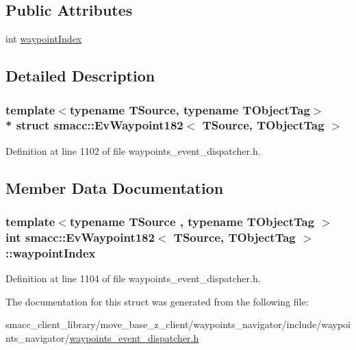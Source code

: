 \subsection*{Public Attributes}
\begin{DoxyCompactItemize}
\item 
int \hyperlink{structsmacc_1_1EvWaypoint182_aa585b165a09108cb04d02b1f05009b06}{waypoint\+Index}
\end{DoxyCompactItemize}


\subsection{Detailed Description}
\subsubsection*{template$<$typename T\+Source, typename T\+Object\+Tag$>$\\*
struct smacc\+::\+Ev\+Waypoint182$<$ T\+Source, T\+Object\+Tag $>$}



Definition at line 1102 of file waypoints\+\_\+event\+\_\+dispatcher.\+h.



\subsection{Member Data Documentation}
\subsubsection[{\texorpdfstring{waypoint\+Index}{waypointIndex}}]{\setlength{\rightskip}{0pt plus 5cm}template$<$typename T\+Source , typename T\+Object\+Tag $>$ int {\bf smacc\+::\+Ev\+Waypoint182}$<$ T\+Source, T\+Object\+Tag $>$\+::waypoint\+Index}\hypertarget{structsmacc_1_1EvWaypoint182_aa585b165a09108cb04d02b1f05009b06}{}\label{structsmacc_1_1EvWaypoint182_aa585b165a09108cb04d02b1f05009b06}


Definition at line 1104 of file waypoints\+\_\+event\+\_\+dispatcher.\+h.



The documentation for this struct was generated from the following file\+:\begin{DoxyCompactItemize}
\item 
smacc\+\_\+client\+\_\+library/move\+\_\+base\+\_\+z\+\_\+client/waypoints\+\_\+navigator/include/waypoints\+\_\+navigator/\hyperlink{waypoints__event__dispatcher_8h}{waypoints\+\_\+event\+\_\+dispatcher.\+h}\end{DoxyCompactItemize}
